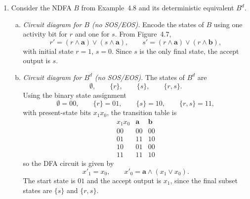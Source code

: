 \begin{enumerate}[{4.}1.]
\begin{enumerate}[(a)]
\[\begin{array}{c|cc}
  Q_{14} & Q_{11} & Q_{12}\\
  Q_{15} & Q_{18} & Q_{19}\\
  Q_{16} & Q_{20} & Q_{21}\\
  Q_{17} & Q_{14} & Q_{15}\\
  Q_{18} & Q_{11} & Q_{17}\\
  Q_{19} & Q_{20} & Q_{19}\\
  Q_{20} & Q_{11} & Q_{12}\\
  Q_{21} & Q_{22} & Q_{19}\\
  Q_{22} & Q_{11} & Q_{17}
  \end{array}
  \]
  The final states are exactly those containing one of $s_6$, $s_{11}$,
  $s_{17}$, or $s_{18}$:
  \[
  Q_8,Q_{10},Q_{11},Q_{12},Q_{13},Q_{14},Q_{15},Q_{16},
  Q_{17},Q_{18},Q_{19},Q_{20},Q_{21},Q_{22}.
  \]
\end{enumerate}

\item Consider the NDFA $B$ from Example~4.8 and its deterministic equivalent $B^d$.

\begin{enumerate}[(a)]
  \item \emph{Circuit diagram for $B$ (no SOS/EOS).}  Encode the states of $B$
  using one activity bit for $r$ and one for $s$.  From Figure~4.7,
  \[
    r'=(r\wedge \pmb{a})\vee(s\wedge \pmb{a}),\qquad
    s'=(r\wedge \pmb{a})\vee(r\wedge \pmb{b}),
  \]
  with initial state $r=1$, $s=0$.  Since $s$ is the only final state, the
  accept output is $s$.

  \item \emph{Circuit diagram for $B^d$ (no SOS/EOS).}  The states of $B^d$ are
  \[
    \emptyset,\qquad \{r\},\qquad \{s\},\qquad \{r,s\}.
  \]
  Using the binary state assignment
  \[
    \emptyset=00,\qquad \{r\}=01,\qquad \{s\}=10,\qquad \{r,s\}=11,
  \]
  with present-state bits $x_1x_0$, the transition table is
  \[
  \begin{array}{c|cc}
  x_1x_0 & \pmb{a} & \pmb{b}\\\hline
  00 & 00 & 00\\
  01 & 11 & 10\\
  10 & 01 & 00\\
  11 & 11 & 10
  \end{array}
  \]
  so the DFA circuit is given by
  \[
    x'_1=x_0,\qquad x'_0=\pmb{a}\wedge(x_1\vee x_0).
  \]
  The start state is $01$ and the accept output is $x_1$, since the final
  subset states are $\{s\}$ and $\{r,s\}$.
\end{enumerate}


\end{enumerate}
